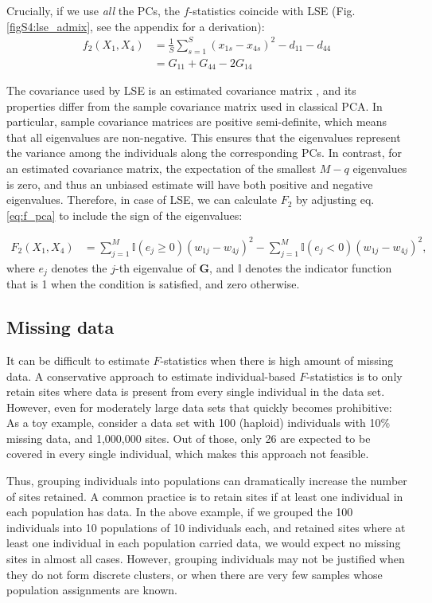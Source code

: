 \documentclass[12pt]{article}
\begin{document}
Crucially, if we use \emph{all} the PCs, the $f$-statistics coincide with LSE (Fig. \ref{figS4:lse_admix}, see the appendix for a derivation): 
\begin{align}
    f_2(X_1, X_4) &= \frac{1}{S} \sum_{s=1}^S (x_{1s} - x_{4s})^2 - d_{11} - d_{44} \nonumber\\
    &= G_{11} + G_{44} - 2 G_{14} \label{eq:lse}
\end{align}

The covariance used by LSE is an estimated covariance matrix \citep{van_waaij_evaluation_2023}, and its properties differ from the sample covariance matrix used in classical PCA. In particular, sample covariance matrices are positive semi-definite, which means that all eigenvalues are non-negative. This ensures that the eigenvalues represent the variance among the individuals along the corresponding PCs. In contrast, for an estimated covariance matrix, the expectation of the smallest $M-q$ eigenvalues is zero, and thus an unbiased estimate will have both positive and negative eigenvalues. Therefore, in case of LSE, we can calculate $F_2$ by adjusting eq. \ref{eq:f_pca} to include the sign of the eigenvalues:


\begin{align}\label{eq:f_lse}
F_2(X_1,X_4) &= \sum_{j=1}^{M}\mathbb{I}(e_j \geq 0) (w_{1j} - w_{4j})^2 - \sum_{j=1}^M \mathbb{I}(e_j <0) (w_{1j} - w_{4j})^2,
\end{align}
where $e_j$ denotes the $j$-th eigenvalue of $\mathbf{G}$, and $\mathbb{I}$ denotes the indicator function that is 1 when the condition is satisfied, and zero otherwise.


\subsection{Missing data}
It can be difficult to estimate $F$-statistics when there is high amount of missing data. A conservative approach to estimate individual-based $F$-statistics is to only retain sites where data is present from every single individual in the data set. However, even for moderately large data sets that quickly becomes prohibitive: As a toy example, consider a data set with 100 (haploid) individuals with 10\% missing data, and 1,000,000 sites. Out of those, only 26 are expected to be covered in every single individual, which makes this approach not feasible.

Thus, grouping individuals into populations can dramatically increase the number of sites retained. A common practice is to retain sites if at least one individual in each population has data. In the above example, if we grouped the 100 individuals into 10 populations of 10 individuals each, and retained sites where at least one individual in each population carried data, we would expect no missing sites in almost all cases. However, grouping individuals may not be justified when they do not form discrete clusters, or when there are very few samples whose population assignments are known.
\end{document}
